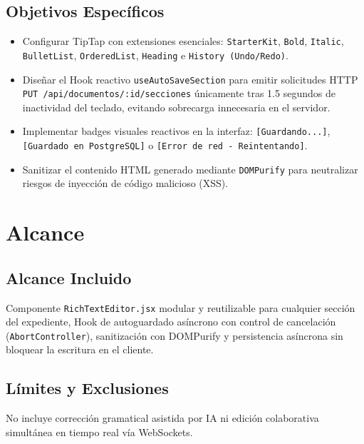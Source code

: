 \documentclass[12pt,a4paper]{article}
\begin{document}
\subsection{Objetivos Específicos}
\begin{itemize}[leftmargin=1.5em, itemsep=1.5pt, topsep=1.5pt]
    \item Configurar TipTap con extensiones esenciales: \texttt{StarterKit}, \texttt{Bold}, \texttt{Italic}, \texttt{BulletList}, \texttt{OrderedList}, \texttt{Heading} e \texttt{History (Undo/Redo)}.
    \item Diseñar el Hook reactivo \texttt{useAutoSaveSection} para emitir solicitudes HTTP \texttt{PUT /api/documentos/:id/secciones} únicamente tras 1.5 segundos de inactividad del teclado, evitando sobrecarga innecesaria en el servidor.
    \item Implementar badges visuales reactivos en la interfaz: \texttt{[Guardando...]}, \texttt{[Guardado en PostgreSQL]} o \texttt{[Error de red - Reintentando]}.
    \item Sanitizar el contenido HTML generado mediante \texttt{DOMPurify} para neutralizar riesgos de inyección de código malicioso (XSS).
\end{itemize}

\section{Alcance}

\subsection{Alcance Incluido}
Componente \texttt{RichTextEditor.jsx} modular y reutilizable para cualquier sección del expediente, Hook de autoguardado asíncrono con control de cancelación (\texttt{AbortController}), sanitización con DOMPurify y persistencia asíncrona sin bloquear la escritura en el cliente.

\subsection{Límites y Exclusiones}
No incluye corrección gramatical asistida por IA ni edición colaborativa simultánea en tiempo real vía WebSockets.

\end{document}
